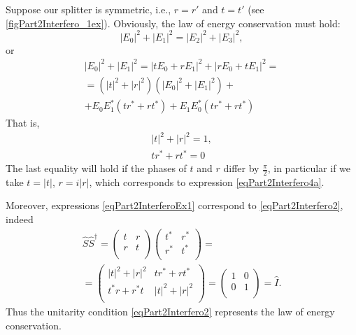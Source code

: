 \begin{example}
  
  
  Suppose our splitter is symmetric, i.e., $r=r'$ and $t = t'$
  (see \autoref{figPart2Interfero_1ex}).
  Obviously, the law of energy conservation must hold:
  \[
  \left|E_0\right|^2 + \left|E_1\right|^2 =
  \left|E_2\right|^2 + \left|E_3\right|^2, 
  \]
  or
  \begin{eqnarray}
    \left|E_0\right|^2 + \left|E_1\right|^2 =
    \left|t E_0 + r E_1\right|^2 + \left|r E_0 + t E_1\right|^2 =
    \nonumber \\
    =
    \left(\left|t\right|^2 + \left|r\right|^2\right) 
    \left(\left|E_0\right|^2 + \left|E_1\right|^2\right) +
    \nonumber \\
    + E_0 E_1^\ast \left(t r^\ast + r t^\ast\right)
    + E_1 E_0^\ast \left(t r^\ast + r t^\ast\right)
    \nonumber
  \end{eqnarray}
  That is,
  \begin{eqnarray}
    \left|t\right|^2 + \left|r\right|^2 = 1,
    \nonumber \\
    t r^\ast + r t^\ast = 0
    \label{eqPart2InterferoEx1}
  \end{eqnarray}
  The last equality will hold if the phases of $t$ and $r$
  differ by $\frac{\pi}{2}$, in particular if we take
  $t = \left|t\right|$, $r = i \left|r\right|$, which corresponds
  to expression \eqref{eqPart2Interfero4a}.

  Moreover, expressions \eqref{eqPart2InterferoEx1} correspond to
  \eqref{eqPart2Interfero2}, indeed
  \begin{eqnarray}
    \hat{S} \hat{S}^{\dag} = 
    \left(
    \begin{array}{cc}
      t & r \\
      r & t \\      
    \end{array}
    \right)
    \left(
    \begin{array}{cc}
      t^{*} & r^{*} \\
      r^{*} & t^{*} \\      
    \end{array}
    \right) =
    \nonumber \\
    =
    \left(
    \begin{array}{cc}
      \left|t\right|^2 + \left|r\right|^2 & t r^\ast + r t^\ast \\
      t^\ast r + r^\ast t & \left|t\right|^2 + \left|r\right|^2 \\
    \end{array}
    \right) =
    \left(
    \begin{array}{cc}
      1 & 0 \\
      0 & 1 \\
    \end{array}
    \right) = \hat{I}.
    \nonumber
  \end{eqnarray}
  Thus the unitarity condition \eqref{eqPart2Interfero2}
  represents the law of energy conservation.
\end{example}